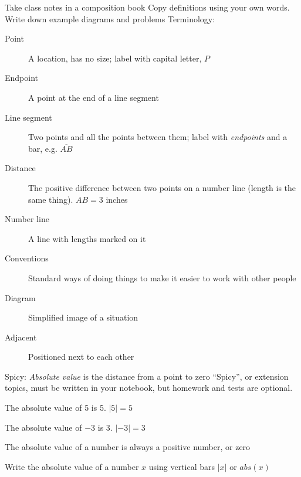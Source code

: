 \begin{frame}{Take class notes in a composition book}
  {Copy definitions using your own words. Write down example diagrams and problems}
  Terminology:
    \begin{description}
      \item[Point] A location, has no size; label with capital letter, $P$
      \item[Endpoint] A point at the end of a line segment
      \item[Line segment] Two points and all the points between them; label with \emph{endpoints} and a bar, e.g. $\overline{AB}$
      \item[Distance] The positive difference between two points on a number line (length is the same thing). $AB=3$ inches
      \item[Number line] A line with lengths marked on it
      \item[Conventions] Standard ways of doing things to make it easier to work with other people
      \item[Diagram] Simplified image of a situation
      \item[Adjacent] Positioned next to each other
    \end{description}
\end{frame}

\begin{frame}{Spicy: \emph{Absolute value} is the distance from a point to zero}
  {``Spicy'', or extension topics, must be written in your notebook, but homework and tests are optional.}
     \par \bigskip
    The absolute value of 5 is 5. $|5|=5$ \par \bigskip
    The absolute value of $-3$ is 3. $|-3|=3$ \par \bigskip
    The absolute value of a number is always a positive number, or zero  \par \smallskip
    Write the absolute value of a number $x$ using vertical bars $|x|$ or $abs(x)$
\end{frame}

